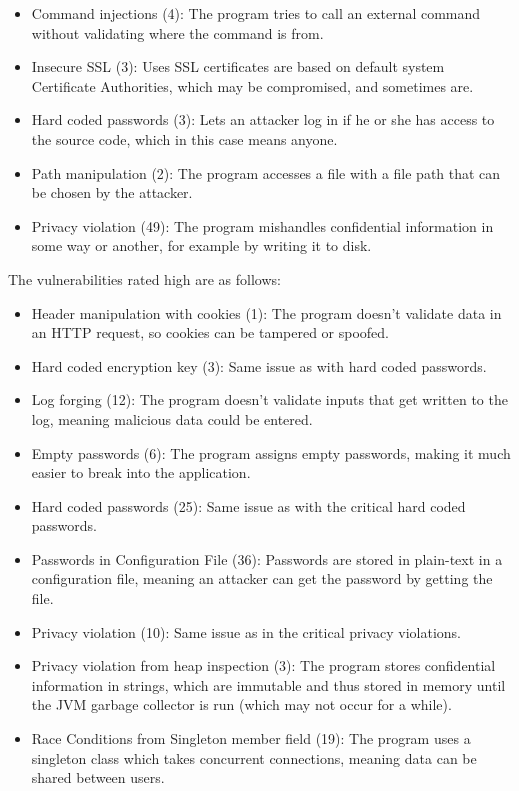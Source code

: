 \documentclass{report} %
\begin{document}
  \begin{itemize}
  \item Command injections (4): The program tries to call an external command
    without validating where the command is from.
  \item Insecure SSL (3): Uses SSL certificates are based on default system
    Certificate Authorities, which may be compromised, and sometimes are.
  \item Hard coded passwords (3): Lets an attacker log in if he or she has access
    to the source code, which in this case means anyone.
  \item Path manipulation (2): The program accesses a file with a file path that
    can be chosen by the attacker.
  \item Privacy violation (49): The program mishandles confidential information
    in some way or another, for example by writing it to disk.
  \end{itemize}

  The vulnerabilities rated high are as follows:

  \begin{itemize}
  \item Header manipulation with cookies (1): The program doesn't validate data
    in an HTTP request, so cookies can be tampered or spoofed.
  \item Hard coded encryption key (3): Same issue as with hard coded passwords.
  \item Log forging (12): The program doesn't validate inputs that get written
    to the log, meaning malicious data could be entered.
  \item Empty passwords (6): The program assigns empty passwords, making it much
    easier to break into the application.
  \item Hard coded passwords (25): Same issue as with the critical hard coded passwords.
  \item Passwords in Configuration File (36): Passwords are stored in plain-text
    in a configuration file, meaning an attacker can get the password by getting
    the file.
  \item Privacy violation (10): Same issue as in the critical privacy violations.
  \item Privacy violation from heap inspection (3): The program stores
    confidential information in strings, which are immutable and thus stored in
    memory until the JVM garbage collector is run (which may not occur for a
    while). 
  \item Race Conditions from Singleton member field (19): The program uses a
    singleton class which takes concurrent connections, meaning data can be
    shared between users.
  \end{itemize}
\end{document}
